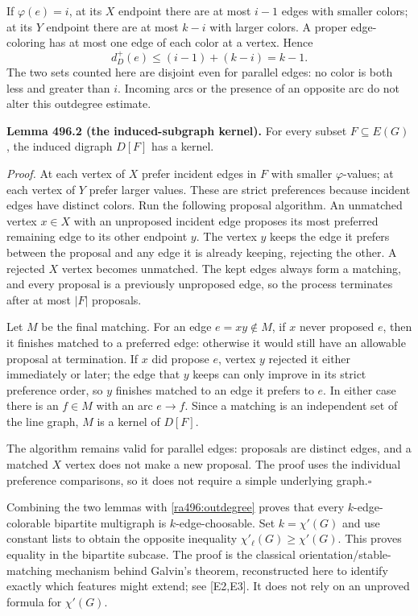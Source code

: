 \documentclass[11pt]{article}
\begin{document}
If $\varphi(e)=i$, at its $X$ endpoint there are at most $i-1$ edges
with smaller colors; at its $Y$ endpoint there are at most $k-i$ with
larger colors. A proper edge-coloring has at most one edge of each color
at a vertex. Hence
\begin{equation}\label{ra496:outdegree}
 d_D^+(e)\leq(i-1)+(k-i)=k-1.
\end{equation}
The two sets counted here are disjoint even for parallel edges: no color
is both less and greater than $i$. Incoming arcs or the presence of an
opposite arc do not alter this outdegree estimate.

\textbf{Lemma 496.2 (the induced-subgraph kernel).}
For every subset $F\subseteq E(G)$, the induced digraph $D[F]$ has a
kernel.

\emph{Proof.}
At each vertex of $X$ prefer incident edges in $F$ with smaller
$\varphi$-values; at each vertex of $Y$ prefer larger values. These are
strict preferences because incident edges have distinct colors. Run the
following proposal algorithm. An unmatched vertex $x\in X$ with an
unproposed incident edge proposes its most preferred remaining edge to
its other endpoint $y$. The vertex $y$ keeps the edge it prefers between
the proposal and any edge it is already keeping, rejecting the other.
A rejected $X$ vertex becomes unmatched. The kept edges always form a
matching, and every proposal is a previously unproposed edge, so the
process terminates after at most $|F|$ proposals.

Let $M$ be the final matching. For an edge $e=xy\notin M$, if $x$ never
proposed $e$, then it finishes matched to a preferred edge: otherwise it
would still have an allowable proposal at termination. If $x$ did
propose $e$, vertex $y$ rejected it either immediately or later; the
edge that $y$ keeps can only improve in its strict preference order,
so $y$ finishes matched to an edge it prefers to $e$. In either case
there is an $f\in M$ with an arc $e\to f$. Since a matching is an
independent set of the line graph, $M$ is a kernel of $D[F]$.

The algorithm remains valid for parallel edges: proposals are distinct
edges, and a matched $X$ vertex does not make a new proposal. The proof
uses the individual preference comparisons, so it does not require a
simple underlying graph.\hfill$\square$

Combining the two lemmas with \eqref{ra496:outdegree} proves that every
$k$-edge-colorable bipartite multigraph is $k$-edge-choosable. Set
$k=\chi'(G)$ and use constant lists to obtain the opposite inequality
$\chi'_\ell(G)\geq\chi'(G)$. This proves equality in the bipartite
subcase. The proof is the classical orientation/stable-matching mechanism
behind Galvin's theorem, reconstructed here to identify exactly which
features might extend; see [E2,E3]. It does not rely on an unproved
formula for $\chi'(G)$.
\end{document}
